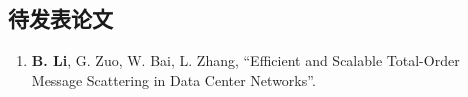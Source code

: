 \begin{publications}
\section*{待发表论文}

\begin{enumerate}
\item \textbf{B. Li}, G. Zuo, W. Bai, L. Zhang, ``Efficient and Scalable Total-Order Message Scattering in Data Center Networks''.
\end{enumerate}


\end{publications}
